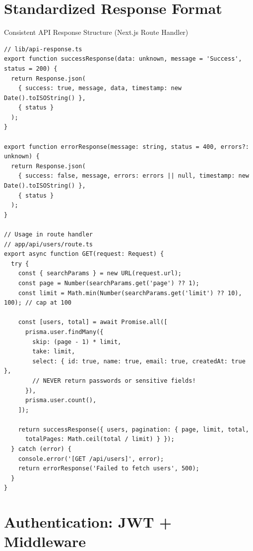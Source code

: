 \documentclass[12pt,a4paper]{article}
\begin{document}
\newpage

\section{Standardized Response Format}

\begin{codebox}{Consistent API Response Structure (Next.js Route Handler)}
\begin{lstlisting}
// lib/api-response.ts
export function successResponse(data: unknown, message = 'Success', status = 200) {
  return Response.json(
    { success: true, message, data, timestamp: new Date().toISOString() },
    { status }
  );
}

export function errorResponse(message: string, status = 400, errors?: unknown) {
  return Response.json(
    { success: false, message, errors: errors || null, timestamp: new Date().toISOString() },
    { status }
  );
}

// Usage in route handler
// app/api/users/route.ts
export async function GET(request: Request) {
  try {
    const { searchParams } = new URL(request.url);
    const page = Number(searchParams.get('page') ?? 1);
    const limit = Math.min(Number(searchParams.get('limit') ?? 10), 100); // cap at 100

    const [users, total] = await Promise.all([
      prisma.user.findMany({
        skip: (page - 1) * limit,
        take: limit,
        select: { id: true, name: true, email: true, createdAt: true },
        // NEVER return passwords or sensitive fields!
      }),
      prisma.user.count(),
    ]);

    return successResponse({ users, pagination: { page, limit, total,
      totalPages: Math.ceil(total / limit) } });
  } catch (error) {
    console.error('[GET /api/users]', error);
    return errorResponse('Failed to fetch users', 500);
  }
}
\end{lstlisting}
\end{codebox}

\newpage

\section{Authentication: JWT + Middleware}
\end{document}
